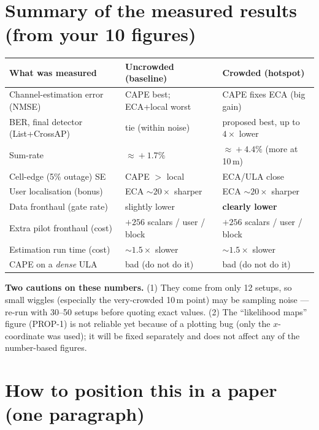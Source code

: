 \documentclass[11pt]{article}
\begin{document}
\section{Summary of the measured results (from your 10 figures)}

\begin{center}
\renewcommand{\arraystretch}{1.22}
\begin{tabular}{@{}p{5.3cm}p{4.0cm}p{4.0cm}@{}}
\toprule
What was measured & Uncrowded (baseline) & Crowded (hotspot)\\
\midrule
Channel-estimation error (NMSE) & CAPE best; ECA+local worst & CAPE fixes ECA (big gain)\\
BER, final detector (List+CrossAP) & tie (within noise) & proposed best, up to $4\times$ lower\\
Sum-rate & $\approx\!+1.7\%$ & $\approx\!+4.4\%$ (more at 10\,m)\\
Cell-edge (5\% outage) SE & CAPE $>$ local & ECA/ULA close\\
User localisation (bonus) & ECA $\sim\!20\times$ sharper & ECA $\sim\!20\times$ sharper\\
Data fronthaul (gate rate) & slightly lower & \textbf{clearly lower}\\
\midrule
Extra pilot fronthaul (cost) & $+256$ scalars / user / block & $+256$ scalars / user / block\\
Estimation run time (cost) & $\sim\!1.5\times$ slower & $\sim\!1.5\times$ slower\\
CAPE on a \emph{dense} ULA & bad (do not do it) & bad (do not do it)\\
\bottomrule
\end{tabular}
\end{center}

\begin{warnbox}
\textbf{Two cautions on these numbers.} (1) They come from only 12 setups, so small wiggles
(especially the very-crowded 10\,m point) may be sampling noise --- re-run with 30--50 setups
before quoting exact values. (2) The ``likelihood maps'' figure (PROP-1) is not reliable yet
because of a plotting bug (only the $x$-coordinate was used); it will be fixed separately and does
not affect any of the number-based figures.
\end{warnbox}

\section{How to position this in a paper (one paragraph)}
\end{document}
